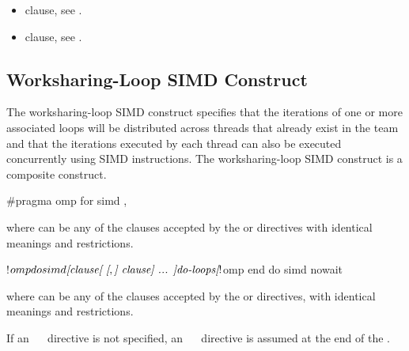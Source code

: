\crossreferences
\begin{itemize}
\item {} clause, see
.

\item {} clause, see
.
\end{itemize}










\begin{samepage}
\subsection{Worksharing-Loop SIMD Construct}
\label{subsec:Worksharing-Loop SIMD Construct}
\summary
The worksharing-loop SIMD construct specifies that the iterations of one or
more associated loops will be distributed across threads that already exist in
the team and that the iterations executed by each thread can also be executed
concurrently using SIMD instructions. The worksharing-loop SIMD construct is a composite construct.
\end{samepage}

\begin{samepage}
\syntax
\begin{ccppspecific}
\begin{ompcPragma}
#pragma omp for simd \plc{[clause[ [},\plc{] clause] ... ] new-line}
\end{ompcPragma}

where  can be any of the clauses accepted by the  or  directives with
identical meanings and restrictions.
\end{ccppspecific}
\end{samepage}

\begin{fortranspecific}
\begin{ompfPragma}
!$omp do simd \plc{[clause[ [},\plc{] clause] ... ]}
   \plc{do-loops}
\plc{[}!$omp end do simd \plc{[}nowait\plc{] ]}
\end{ompfPragma}

where  can be any of the clauses accepted by the  or  directives, with
identical meanings and restrictions.

If an ~~ directive is not specified, an ~~ directive is
assumed at the end of the .
\end{fortranspecific}

